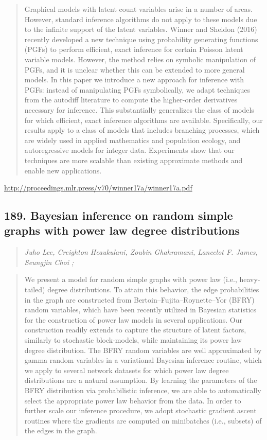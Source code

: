 \documentclass{article}
\begin{document}
\begin{quote}
    Graphical models with latent count variables arise in a number of areas. However, standard inference algorithms do not apply to these models due to the infinite support of the latent variables. Winner and Sheldon (2016) recently developed a new technique using probability generating functions (PGFs) to perform efficient, exact inference for certain Poisson latent variable models. However, the method relies on symbolic manipulation of PGFs, and it is unclear whether this can be extended to more general models. In this paper we introduce a new approach for inference with PGFs: instead of manipulating PGFs symbolically, we adapt techniques from the autodiff literature to compute the higher-order derivatives necessary for inference. This substantially generalizes the class of models for which efficient, exact inference algorithms are available. Specifically, our results apply to a class of models that includes branching processes, which are widely used in applied mathematics and population ecology, and autoregressive models for integer data. Experiments show that our techniques are more scalable than existing approximate methods and enable new applications.  \end{quote}

\href{http://proceedings.mlr.press/v70/winner17a/winner17a.pdf}{http://proceedings.mlr.press/v70/winner17a/winner17a.pdf}

\subsection{189. Bayesian inference on random simple graphs with power law degree distributions}

\begin{quote}
\footnotesize{\textit{Juho Lee, Creighton Heaukulani, Zoubin Ghahramani, Lancelot F. James, Seungjin Choi ;}}
\end{quote}

\begin{quote}
    We present a model for random simple graphs with power law (i.e., heavy-tailed) degree distributions. To attain this behavior, the edge probabilities in the graph are constructed from Bertoin–Fujita–Roynette–Yor (BFRY) random variables, which have been recently utilized in Bayesian statistics for the construction of power law models in several applications. Our construction readily extends to capture the structure of latent factors, similarly to stochastic block-models, while maintaining its power law degree distribution. The BFRY random variables are well approximated by gamma random variables in a variational Bayesian inference routine, which we apply to several network datasets for which power law degree distributions are a natural assumption. By learning the parameters of the BFRY distribution via probabilistic inference, we are able to automatically select the appropriate power law behavior from the data. In order to further scale our inference procedure, we adopt stochastic gradient ascent routines where the gradients are computed on minibatches (i.e., subsets) of the edges in the graph.  \end{quote}
\end{document}
